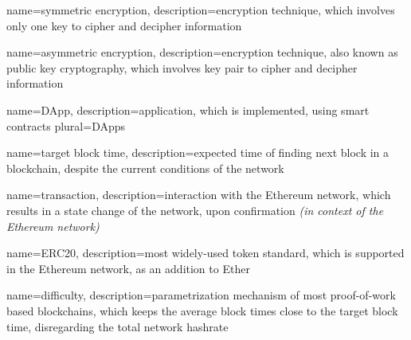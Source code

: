 {
    name=symmetric encryption,
    description={encryption technique, which involves only one key to cipher and decipher information}
}

{
    name=asymmetric encryption,
    description={encryption technique, also known as public key cryptography, which involves key pair to cipher and decipher information}
}

{
    name=DApp,
    description={application, which is implemented, using smart contracts}
    plural=DApps
}

{
    name=target block time,
    description={expected time of finding next block in a blockchain, despite the current conditions of the network}
}

{
    name=transaction,
    description={interaction with the Ethereum network, which results in a state change of the network, upon confirmation \textit{(in context of the Ethereum network)}}
}

{
    name=ERC20,
    description={most widely-used token standard, which is supported in the Ethereum network, as an addition to Ether}
}

{
    name=difficulty,
    description={parametrization mechanism of most proof-of-work based blockchains, which keeps the average block times close to the target block time, disregarding the total network hashrate}
}
